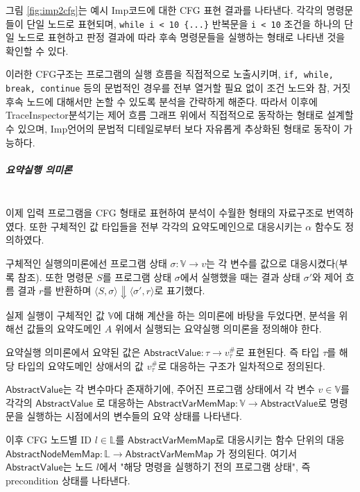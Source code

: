 \documentclass[a4paper,12pt]{article}
\newcommand{\imp}{\textsf{Imp}}
\newcommand{\traceinspector}{\textsf{TraceInspector}}
\begin{document}
그림 \ref{fig:imp2cfg}는 예시 \imp 코드에 대한 CFG 표현 결과를 나타낸다. 각각의 명령문들이 단일 노드로 표현되며, \verb|while i < 10 {...}| 반복문을
\verb|i < 10| 조건을 하나의 단일 노드로 표현하고 판정 결과에 따라 후속 명령문들을 실행하는 형태로 나타낸 것을 확인할 수 있다.

이러한 CFG구조는 프로그램의 실행 흐름을 직접적으로 노출시키며, \verb|if, while, break, continue| 등의 문법적인 경우를 전부 열거할 필요 없이 조건 노드와 
참, 거짓 후속 노드에 대해서만 논할 수 있도록 분석을 간략하게 해준다. 
따라서 이후에 \traceinspector 분석기는 제어 흐름 그래프 위에서 직접적으로 동작하는 형태로 설계할 수 있으며, \imp 언어의 문법적 디테일로부터 보다 자유롭게 추상화된 형태로 동작이 가능하다.

\subparagraph{요약실행 의미론} ~\\

이제 입력 프로그램을 CFG 형태로 표현하여 분석이 수월한 형태의 자료구조로 번역하였다. 또한  구체적인 값 타입들을 전부 각각의 요약도메인으로 대응시키는 $\alpha$ 함수도 정의하였다.

 구체적인 실행의미론에선 프로그램 상태 $\sigma : \mathbb{V} \rightarrow v$는 각 변수를 값으로 대응시켰다(부록 참조). 
또한 명령문 $S$를 프로그램 상태 $\sigma$에서 실행했을 때는 결과 상태 $\sigma'$와 제어 흐름 결과 $r$를 반환하며
$\langle S, \sigma \rangle \Downarrow \langle \sigma', r \rangle$로 표기했다.

 실제 실행이 구체적인 값 $\mathbb{V}$에 대해 계산을 하는 의미론에 바탕을 두었다면, 분석을 위해선 값들의 요약도메인 $A$ 위에서 실행되는 요약실행 의미론을 정의해야 한다.

요약실행 의미론에서 요약된 값은 $\mathsf{AbstractValue} : \tau \rightarrow v^{\#}_\tau$로 표현된다.
즉 타입 $\tau$를 해당 타입의 요약도메인 상애서의 값 $v^{\#}_\tau$로 대응하는 구조가 일차적으로 정의된다.

$\mathsf{AbstractValue}$는 각 변수마다 존재하기에, 주어진 프로그램 상태에서 각 변수 $v \in \mathbb{V}$를 각각의 $\mathsf{AbstractValue}$ 로 대응하는 $\mathsf{AbstractVarMemMap} : \mathbb{V} \rightarrow \mathsf{AbstractValue}$로 명령문을 실행하는 시점에서의 변수들의 요약 상태를 나타낸다.

이후 CFG 노드별 ID $l \in \mathbb{L}$를 $\mathsf{AbstractVarMemMap}$로 대응시키는 함수 단위의 대응 $\mathsf{AbstractNodeMemMap} : \mathbb{L} \rightarrow \mathsf{AbstractVarMemMap}$ 가 정의된다.
여기서 $\mathsf{AbstractValue}$는 노드 $l$에서 "해당 명령을 실행하기 전의 프로그램 상태", 즉 precondition 상태를 나타낸다.
\end{document}
